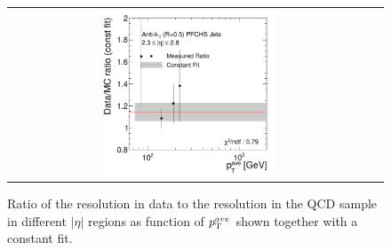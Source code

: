 \begin{figure}[!htp]
\begin{tabular}{cc}
                \includegraphics[width=0.49\textwidth]{figures/ExtrapolRatio_Eta4_with_pli_final_nominal_v4.pdf}
  \end{tabular}
  \caption{Ratio of the resolution in data to the resolution in the QCD sample in different $|\eta|$ regions as function of $p_{\text{T}}^{ave}$ shown together with a constant fit.}
  \label{fig:ratio}
\end{figure}

